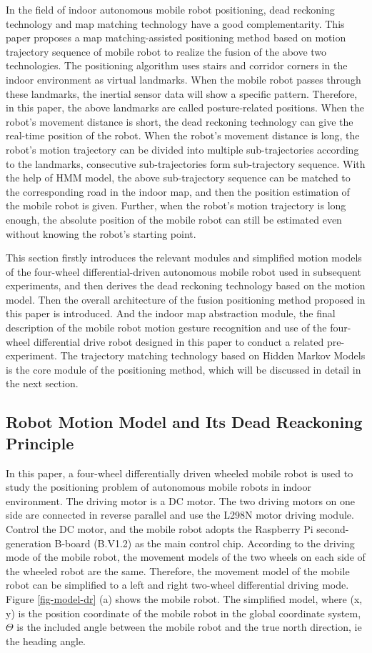 \documentclass{llncs}
\begin{document}
In the field of indoor autonomous mobile robot positioning, dead reckoning technology and map matching technology have a good complementarity. This paper proposes a map matching-assisted positioning method based on motion trajectory sequence of mobile robot to realize the fusion of the above two technologies. The positioning algorithm uses stairs and corridor corners in the indoor environment as virtual landmarks. When the mobile robot passes through these landmarks, the inertial sensor data will show a specific pattern. Therefore, in this paper, the above landmarks are called posture-related positions. When the robot's movement distance is short, the dead reckoning technology can give the real-time position of the robot. When the robot's movement distance is long, the robot's motion trajectory can be divided into multiple sub-trajectories according to the landmarks, consecutive sub-trajectories form sub-trajectory sequence. With the help of HMM model, the above sub-trajectory sequence can be matched to the corresponding road in the indoor map, and then the position estimation of the mobile robot is given. Further, when the robot's motion trajectory is long enough, the absolute position of the mobile robot can still be estimated even without knowing the robot's starting point.

This section firstly introduces the relevant modules and simplified motion models of the four-wheel differential-driven autonomous mobile robot used in subsequent experiments, and then derives the dead reckoning technology based on the motion model. Then the overall architecture of the fusion positioning method proposed in this paper is introduced. And the indoor map abstraction module, the final description of the mobile robot motion gesture recognition and use of the four-wheel differential drive robot designed in this paper to conduct a related pre-experiment. The trajectory matching technology based on Hidden Markov Models is the core module of the positioning method, which will be discussed in detail in the next section.

\subsection{Robot Motion Model and Its Dead Reackoning Principle}

In this paper, a four-wheel differentially driven wheeled mobile robot is used to study the positioning problem of autonomous mobile robots in indoor environment. The driving motor is a DC motor. The two driving motors on one side are connected in reverse parallel and use the L298N motor driving module. Control the DC motor, and the mobile robot adopts the Raspberry Pi second-generation B-board (B.V1.2) as the main control chip. According to the driving mode of the mobile robot, the movement models of the two wheels on each side of the wheeled robot are the same. Therefore, the movement model of the mobile robot can be simplified to a left and right two-wheel differential driving mode. Figure \ref{fig-model-dr} (a) shows the mobile robot. The simplified model, where (x, y) is the position coordinate of the mobile robot in the global coordinate system, $\Theta$ is the included angle between the mobile robot and the true north direction, ie the heading angle.
\end{document}
